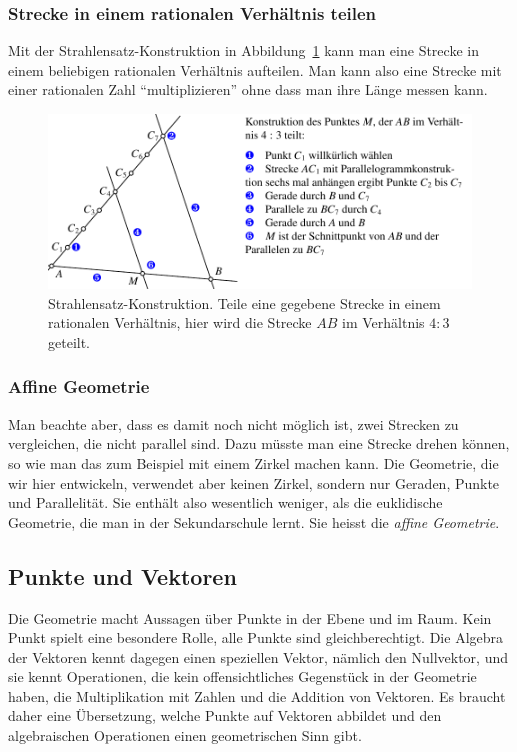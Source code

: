 \subsubsection{Strecke in einem rationalen Verhältnis teilen}
Mit der Strahlensatz-Konstruktion in
Abbildung~\ref{skript:affin:strahlensatz}
kann man eine Strecke in einem beliebigen rationalen Verhältnis aufteilen.
Man kann also eine Strecke mit einer rationalen Zahl ``multiplizieren''
ohne dass man ihre Länge messen kann.
\begin{figure}
\centering
\includegraphics{3/images/strahlensatz.pdf}
\caption{Strahlensatz-Konstruktion. 
Teile eine gegebene Strecke in einem rationalen Verhältnis, hier wird
die Strecke $AB$ im Verhältnis $4:3$ geteilt.
\label{skript:affin:strahlensatz}}
\end{figure}

\subsubsection{Affine Geometrie}
Man beachte aber, dass es damit noch nicht möglich ist, zwei Strecken
zu vergleichen, die nicht parallel sind.
Dazu müsste man eine Strecke drehen können, so wie man das zum Beispiel
mit einem Zirkel machen kann.
Die Geometrie, die wir hier entwickeln, verwendet aber keinen Zirkel,
sondern nur Geraden, Punkte und Parallelität.
Sie enthält also wesentlich weniger, als die euklidische Geometrie, die
man in der Sekundarschule lernt.
Sie heisst die {\em affine Geometrie}.

%
%
\subsection{Punkte und Vektoren}
Die Geometrie macht Aussagen über Punkte in der Ebene und im Raum.
Kein Punkt spielt eine besondere Rolle, alle Punkte sind gleichberechtigt.
Die Algebra der Vektoren kennt dagegen einen speziellen Vektor,
nämlich den Nullvektor, und sie kennt Operationen, die kein offensichtliches
Gegenstück in der Geometrie haben, die Multiplikation mit Zahlen und
die Addition von Vektoren.
Es braucht daher eine Übersetzung, welche Punkte auf Vektoren
abbildet und den algebraischen Operationen einen geometrischen
Sinn gibt.

